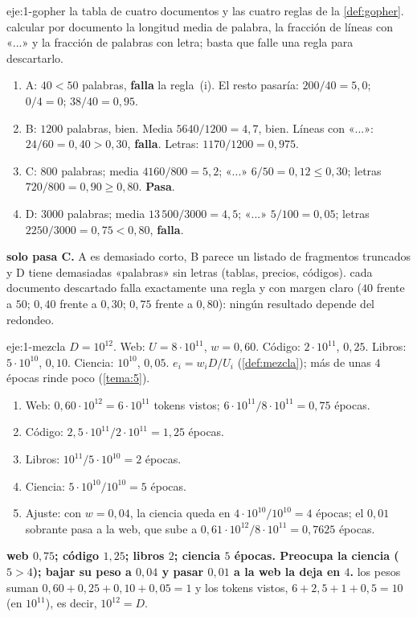 \begin{solucion}{eje:1-gopher}
\datos la tabla de cuatro documentos y las cuatro reglas de la \cref{def:gopher}.
\planteamiento calcular por documento la longitud media de palabra, la fracción de líneas con «...» y la fracción de palabras con letra; basta que falle una regla para descartarlo.
\pasos
\begin{enumerate}[label=\arabic*.]
  \item A: $40<50$ palabras, \textbf{falla} la regla~(i). El resto pasaría: $200/40=5{,}0$; $0/4=0$; $38/40=0{,}95$.
  \item B: $1200$ palabras, bien. Media $5640/1200=4{,}7$, bien. Líneas con «...»: $24/60=0{,}40>0{,}30$, \textbf{falla}. Letras: $1170/1200=0{,}975$.
  \item C: $800$ palabras; media $4160/800=5{,}2$; «...» $6/50=0{,}12\le 0{,}30$; letras $720/800=0{,}90\ge 0{,}80$. \textbf{Pasa}.
  \item D: $3000$ palabras; media $13\,500/3000=4{,}5$; «...» $5/100=0{,}05$; letras $2250/3000=0{,}75<0{,}80$, \textbf{falla}.
\end{enumerate}
\resultado \textbf{solo pasa C.} A es demasiado corto, B parece un listado de fragmentos truncados y D tiene demasiadas «palabras» sin letras (tablas, precios, códigos).
\comprobacion cada documento descartado falla exactamente una regla y con margen claro ($40$ frente a $50$; $0{,}40$ frente a $0{,}30$; $0{,}75$ frente a $0{,}80$): ningún resultado depende del redondeo.
\end{solucion}

\begin{solucion}{eje:1-mezcla}
\datos $D=10^{12}$. Web: $U=8\cdot 10^{11}$, $w=0{,}60$. Código: $2\cdot 10^{11}$, $0{,}25$. Libros: $5\cdot 10^{10}$, $0{,}10$. Ciencia: $10^{10}$, $0{,}05$.
\planteamiento $e_i=w_iD/U_i$ (\cref{def:mezcla}); más de unas $4$ épocas rinde poco (\cref{tema:5}).
\pasos
\begin{enumerate}[label=\arabic*.]
  \item Web: $0{,}60\cdot 10^{12}=6\cdot 10^{11}$ tokens vistos; $6\cdot 10^{11}/8\cdot 10^{11}=0{,}75$ épocas.
  \item Código: $2{,}5\cdot 10^{11}/2\cdot 10^{11}=1{,}25$ épocas.
  \item Libros: $10^{11}/5\cdot 10^{10}=2$ épocas.
  \item Ciencia: $5\cdot 10^{10}/10^{10}=5$ épocas.
  \item Ajuste: con $w=0{,}04$, la ciencia queda en $4\cdot 10^{10}/10^{10}=4$ épocas; el $0{,}01$ sobrante pasa a la web, que sube a $0{,}61\cdot 10^{12}/8\cdot 10^{11}=0{,}7625$ épocas.
\end{enumerate}
\resultado \textbf{web $0{,}75$; código $1{,}25$; libros $2$; ciencia $5$ épocas. Preocupa la ciencia ($5>4$); bajar su peso a $0{,}04$ y pasar $0{,}01$ a la web la deja en $4$.}
\comprobacion los pesos suman $0{,}60+0{,}25+0{,}10+0{,}05=1$ y los tokens vistos, $6+2{,}5+1+0{,}5=10$ (en $10^{11}$), es decir, $10^{12}=D$.
\end{solucion}

